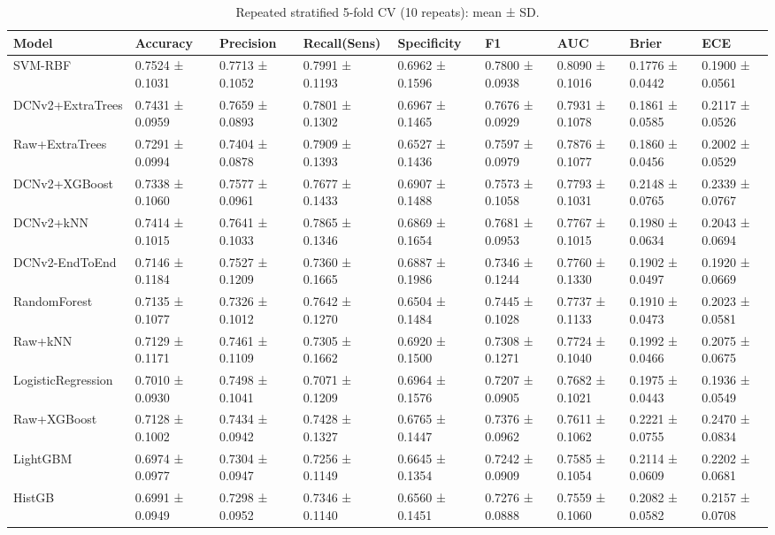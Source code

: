 \begin{table}
\caption{Repeated stratified 5-fold CV (10 repeats): mean ± SD.}
\label{tab:cv}
\begin{tabular}{lllllllll}
\toprule
Model & Accuracy & Precision & Recall(Sens) & Specificity & F1 & AUC & Brier & ECE \\
\midrule
SVM-RBF & 0.7524 ± 0.1031 & 0.7713 ± 0.1052 & 0.7991 ± 0.1193 & 0.6962 ± 0.1596 & 0.7800 ± 0.0938 & 0.8090 ± 0.1016 & 0.1776 ± 0.0442 & 0.1900 ± 0.0561 \\
DCNv2+ExtraTrees & 0.7431 ± 0.0959 & 0.7659 ± 0.0893 & 0.7801 ± 0.1302 & 0.6967 ± 0.1465 & 0.7676 ± 0.0929 & 0.7931 ± 0.1078 & 0.1861 ± 0.0585 & 0.2117 ± 0.0526 \\
Raw+ExtraTrees & 0.7291 ± 0.0994 & 0.7404 ± 0.0878 & 0.7909 ± 0.1393 & 0.6527 ± 0.1436 & 0.7597 ± 0.0979 & 0.7876 ± 0.1077 & 0.1860 ± 0.0456 & 0.2002 ± 0.0529 \\
DCNv2+XGBoost & 0.7338 ± 0.1060 & 0.7577 ± 0.0961 & 0.7677 ± 0.1433 & 0.6907 ± 0.1488 & 0.7573 ± 0.1058 & 0.7793 ± 0.1031 & 0.2148 ± 0.0765 & 0.2339 ± 0.0767 \\
DCNv2+kNN & 0.7414 ± 0.1015 & 0.7641 ± 0.1033 & 0.7865 ± 0.1346 & 0.6869 ± 0.1654 & 0.7681 ± 0.0953 & 0.7767 ± 0.1015 & 0.1980 ± 0.0634 & 0.2043 ± 0.0694 \\
DCNv2-EndToEnd & 0.7146 ± 0.1184 & 0.7527 ± 0.1209 & 0.7360 ± 0.1665 & 0.6887 ± 0.1986 & 0.7346 ± 0.1244 & 0.7760 ± 0.1330 & 0.1902 ± 0.0497 & 0.1920 ± 0.0669 \\
RandomForest & 0.7135 ± 0.1077 & 0.7326 ± 0.1012 & 0.7642 ± 0.1270 & 0.6504 ± 0.1484 & 0.7445 ± 0.1028 & 0.7737 ± 0.1133 & 0.1910 ± 0.0473 & 0.2023 ± 0.0581 \\
Raw+kNN & 0.7129 ± 0.1171 & 0.7461 ± 0.1109 & 0.7305 ± 0.1662 & 0.6920 ± 0.1500 & 0.7308 ± 0.1271 & 0.7724 ± 0.1040 & 0.1992 ± 0.0466 & 0.2075 ± 0.0675 \\
LogisticRegression & 0.7010 ± 0.0930 & 0.7498 ± 0.1041 & 0.7071 ± 0.1209 & 0.6964 ± 0.1576 & 0.7207 ± 0.0905 & 0.7682 ± 0.1021 & 0.1975 ± 0.0443 & 0.1936 ± 0.0549 \\
Raw+XGBoost & 0.7128 ± 0.1002 & 0.7434 ± 0.0942 & 0.7428 ± 0.1327 & 0.6765 ± 0.1447 & 0.7376 ± 0.0962 & 0.7611 ± 0.1062 & 0.2221 ± 0.0755 & 0.2470 ± 0.0834 \\
LightGBM & 0.6974 ± 0.0977 & 0.7304 ± 0.0947 & 0.7256 ± 0.1149 & 0.6645 ± 0.1354 & 0.7242 ± 0.0909 & 0.7585 ± 0.1054 & 0.2114 ± 0.0609 & 0.2202 ± 0.0681 \\
HistGB & 0.6991 ± 0.0949 & 0.7298 ± 0.0952 & 0.7346 ± 0.1140 & 0.6560 ± 0.1451 & 0.7276 ± 0.0888 & 0.7559 ± 0.1060 & 0.2082 ± 0.0582 & 0.2157 ± 0.0708 \\

\end{tabular}
\end{table}
